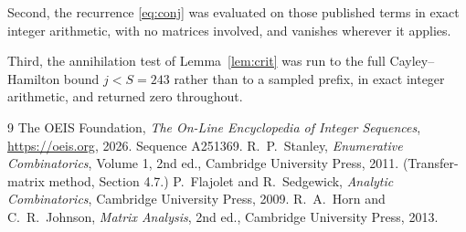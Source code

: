 \documentclass[11pt,a4paper]{article}
\theoremstyle{plain}
\theoremstyle{definition}
\begin{document}
Second, the recurrence \eqref{eq:conj} was evaluated on those published terms in exact
integer arithmetic, with no matrices involved, and vanishes wherever it applies.

Third, the annihilation test of Lemma~\ref{lem:crit} was run to the full Cayley--Hamilton
bound $j<S=243$ rather than to a sampled prefix, in exact integer arithmetic, and returned
zero throughout.

\begin{thebibliography}{9}
 The OEIS Foundation, \emph{The On-Line Encyclopedia of Integer
Sequences}, \url{https://oeis.org}, 2026. Sequence A251369.
 R.~P.~Stanley, \emph{Enumerative Combinatorics}, Volume 1, 2nd ed.,
Cambridge University Press, 2011. (Transfer-matrix method, Section 4.7.)
 P.~Flajolet and R.~Sedgewick, \emph{Analytic Combinatorics}, Cambridge
University Press, 2009.
 R.~A.~Horn and C.~R.~Johnson, \emph{Matrix Analysis}, 2nd ed., Cambridge
University Press, 2013.
\end{thebibliography}
\end{document}
